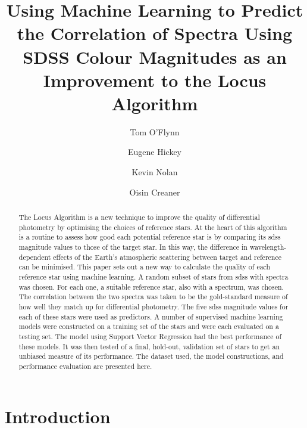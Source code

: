 \documentclass[]{elsarticle} %
\begin{document}
\begin{frontmatter}

  \title{Using Machine Learning to Predict the Correlation of Spectra
Using SDSS Colour Magnitudes as an Improvement to the Locus Algorithm}
    \author[Technological University Dublin]{Tom O'Flynn}
    \author[Technological University Dublin]{Eugene Hickey}
    \author[Technological University Dublin]{Kevin Nolan}
    \author[Dublin Institute of Advanced Studies]{Oisin
Creaner}
      \address[Technological University Dublin]{Department of Applied
Science, Dublin D24FKT9}
    \address[Dublin Institute of Advanced Studies]{10 Burlington Rd,
Dublin, D04 C932, Ireland}
  
  \begin{abstract}
  The Locus Algorithm is a new technique to improve the quality of
  differential photometry by optimising the choices of reference stars.
  At the heart of this algorithm is a routine to assess how good each
  potential reference star is by comparing its sdss magnitude values to
  those of the target star. In this way, the difference in
  wavelength-dependent effects of the Earth's atmospheric scattering
  between target and reference can be minimised. This paper sets out a
  new way to calculate the quality of each reference star using machine
  learning. A random subset of stars from sdss with spectra was chosen.
  For each one, a suitable reference star, also with a spectrum, was
  chosen. The correlation between the two spectra was taken to be the
  gold-standard measure of how well they match up for differential
  photometry. The five sdss magnitude values for each of these stars
  were used as predictors. A number of supervised machine learning
  models were constructed on a training set of the stars and were each
  evaluated on a testing set. The model using Support Vector Regression
  had the best performance of these models. It was then tested of a
  final, hold-out, validation set of stars to get an unbiased measure of
  its performance. The dataset used, the model constructions, and
  performance evaluation are presented here.
  \end{abstract}
  
 \end{frontmatter}

\hypertarget{introduction}{%
\section{Introduction}\label{introduction}}
\end{document}
